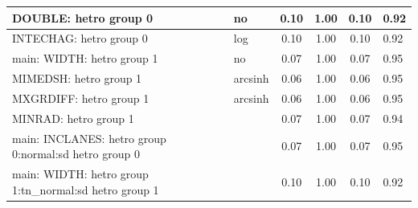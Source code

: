 \begin{table}
\begin{center}
\begin{tabular}{|l|l|c|c|c|l|}
			\hline
			DOUBLE: hetro group 0 & no & 0.10 & 1.00 & 0.10 & 0.92 \\
			\hline
			INTECHAG: hetro group 0 & log & 0.10 & 1.00 & 0.10 & 0.92 \\
			\hline
			main: WIDTH: hetro group 1 & no & 0.07 & 1.00 & 0.07 & 0.95 \\
			\hline
			MIMEDSH: hetro group 1 & arcsinh & 0.06 & 1.00 & 0.06 & 0.95 \\
			\hline
			MXGRDIFF: hetro group 1 & arcsinh & 0.06 & 1.00 & 0.06 & 0.95 \\
			\hline
			MINRAD: hetro group 1 &  & 0.07 & 1.00 & 0.07 & 0.94 \\
			\hline
			main: INCLANES: hetro group 0:normal:sd  hetro group 0 &  & 0.07 & 1.00 & 0.07 & 0.95 \\
			\hline
			main: WIDTH: hetro group 1:tn_normal:sd  hetro group 1 &  & 0.10 & 1.00 & 0.10 & 0.92 \\
			\hline
		\end{tabular}
	\end{center}
\end{table}
